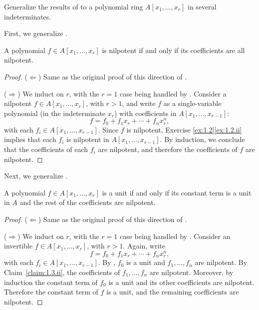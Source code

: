 \begin{exercise}
Generalize the results of  to a polynomial ring \(A[x_1,\ldots,x_r]\) in several indeterminates.
\end{exercise}

\begin{solution}
First, we generalize .

\begin{claim}
\label{claim:1.3.ii}
A polynomial \(f\in A[x_1,\ldots,x_r]\) is nilpotent if and only if its coefficients are all nilpotent.
\end{claim}

\begin{proof}
(\(\Leftarrow\))
Same as the original proof of this direction of .

(\(\Rightarrow\))
We induct on \(r\), with the \(r=1\) case being handled by .
Consider a nilpotent \(f \in A[x_1,\ldots,x_r]\), with \(r > 1\), and write \(f\) as a single-variable polynomial (in the indeterminate \(x_r\)) with coefficients in \(A[x_1,\ldots,x_{r-1}]\):
\begin{equation*}
f = f_0 + f_1 x_r + \cdots + f_n x_r^n,
\end{equation*}
with each \(f_i \in A[x_1,\ldots,x_{r-1}]\).
Since \(f\) is nilpotent, Exercise \ref{ex:1.2}\ref{ex:1.2.ii} implies that each \(f_i\) is nilpotent in \(A[x_1,\ldots,x_{r-1}]\).
By induction, we conclude that the coefficients of each \(f_i\) are nilpotent, and therefore the coefficients of \(f\) are nilpotent.
\end{proof}

Next, we generalize .

\begin{claim}
\label{claim:1.3.i}
A polynomial \(f \in A[x_1, \ldots, x_r]\) is a unit if and only if its constant term is a unit in \(A\) and the rest of the coefficients are nilpotent.
\end{claim}

\begin{proof}
(\(\Leftarrow\))
Same as the original proof of this direction of .

(\(\Rightarrow\))
We induct on \(r\), with the \(r = 1\) case being handled by .
Consider an invertible \(f \in A[x_1, \ldots, x_r]\), with \(r > 1\).
Again, write
\begin{equation*}
f = f_0 + f_1 x_r + \cdots + f_n x_r^n,
\end{equation*}
with each \(f_i \in A[x_1, \ldots, x_{r-1}]\).
By , \(f_0\) is a unit and \(f_1, \ldots, f_n\) are nilpotent.
By Claim~\ref{claim:1.3.ii}, the coefficients of \(f_1, \ldots, f_n\) are nilpotent.
Moreover, by induction the constant term of \(f_0\) is a unit and its other coefficients are nilpotent.
Therefore the constant term of \(f\) is a unit, and the remaining coefficients are nilpotent.
\end{proof}


\end{solution}
